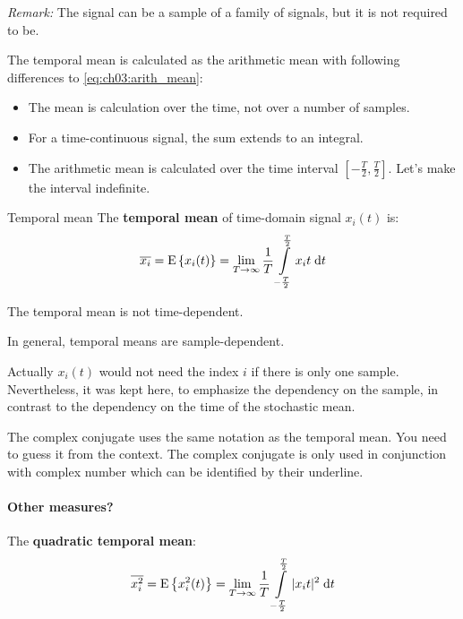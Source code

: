 \begin{refsection}
\textit{Remark:} The signal can be a sample of a family of signals, but it is not required to be.

The temporal mean is calculated as the arithmetic mean with following differences to \eqref{eq:ch03:arith_mean}:
\begin{itemize}
	\item The mean is calculation over the time, not over a number of samples.
	\item For a time-continuous signal, the sum extends to an integral.
	\item The arithmetic mean is calculated over the time interval $[-\frac{T}{2}, \frac{T}{2}]$. Let's make the interval indefinite.
\end{itemize}

\begin{definition}{Temporal mean}
	The  \textbf{temporal mean} of time-domain signal $x_i(t)$ is:
	\begin{equation}
		\overline{x_i} = \mathrm{E}\left\{x_i(t)\right\} = \lim\limits_{T \rightarrow \infty} \frac{1}{T} \int\limits_{-\frac{T}{2}}^{\frac{T}{2}} x_i{t} \; \mathrm{d} t
	\end{equation}%
\end{definition}

The temporal mean is not time-dependent.

\begin{fact}
	In general, temporal means are sample-dependent.
\end{fact}

Actually $x_i(t)$ would not need the index $i$ if there is only one sample. Nevertheless, it was kept here, to emphasize the dependency on the sample, in contrast to the dependency on the time of the stochastic mean.

\begin{attention}
	The complex conjugate uses the same notation as the temporal mean. You need to guess it from the context. The complex conjugate is only used in conjunction with complex number which can be identified by their underline.
\end{attention}

\paragraph{Other measures?}

The  \textbf{quadratic temporal mean}:
\begin{equation}
	\overline{x^2_i} = \mathrm{E}\left\{x^2_i(t)\right\} = \lim\limits_{T \rightarrow \infty} \frac{1}{T} \int\limits_{-\frac{T}{2}}^{\frac{T}{2}} |x_i{t}|^2 \; \mathrm{d} t
\end{equation}


\end{refsection}
